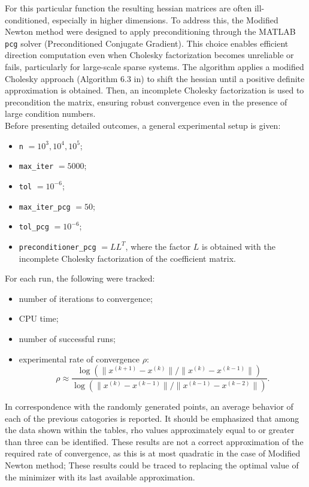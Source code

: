 \documentclass[a4paper,12pt]{article}
\begin{document}
	For this particular function the resulting hessian matrices are often ill-conditioned, especially in higher dimensions. To address this, the Modified Newton method were designed to apply preconditioning through the MATLAB \texttt{pcg} solver (Preconditioned Conjugate Gradient). This choice enables efficient direction computation even when Cholesky factorization becomes unreliable or fails, particularly for large-scale sparse systems.
	The algorithm applies a modified Cholesky approach (Algorithm 6.3 in) to shift the hessian until a positive definite approximation is obtained. Then, an incomplete Cholesky factorization is used to precondition the matrix, ensuring robust convergence even in the presence of large condition numbers.\\
	
	 \noindent Before presenting detailed outcomes, a general experimental setup is given:
	\begin{itemize}
		\item \texttt{n} $= 10^{3},10^{4},10^{5}$;
		\item \texttt{max\_iter} $= 5000$;
		\item \texttt{tol} $= 10^{-6}$;
		\item \texttt{max\_iter\_pcg} $= 50$;
		\item \texttt{tol\_pcg} $= 10^{-6}$;
		\item \texttt{preconditioner\_pcg} $= LL^{T}$, where the factor $L$ is obtained with the incomplete Cholesky factorization of the coefficient matrix.
	\end{itemize}
	\vspace{0.2cm}
	For each run, the following were tracked:
	\begin{itemize}
		\item number of iterations to convergence;
		\item CPU time;
		\item number of successful runs;
		\item experimental rate of convergence \(\rho\):
		\[
		\rho \approx \frac{\log\left(\|x^{(k+1)} - x^{(k)}\|\big/\|x^{(k)} - x^{(k-1)}\|\right)}{\log\left(\|x^{(k)} - x^{(k-1)}\|\big/\|x^{(k-1)} - x^{(k-2)}\|\right)}.
		\]		
	\end{itemize}
	In correspondence with the randomly generated points, an average behavior of each of the previous catogories is reported. It should be emphasized that among the data shown within the tables, rho values approximately equal to or greater than three can be identified. These results are not a correct approximation of the required rate of convergence, as this is at most quadratic in the case of Modified Newton method; These results could be traced to replacing the optimal value of the minimizer with its last available approximation.\\   		
	
\end{document}
